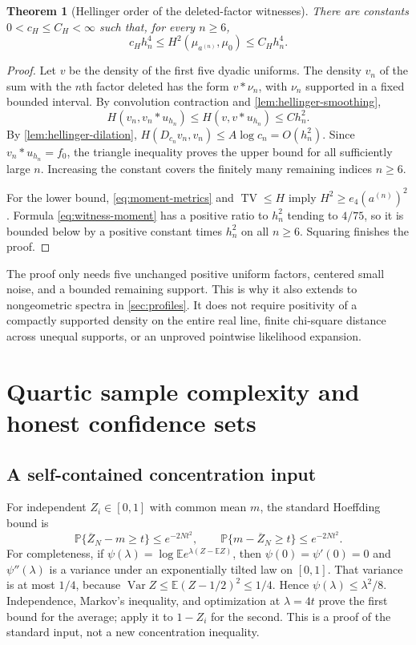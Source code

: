 \documentclass[11pt,a4paper]{article}
\numberwithin{equation}{section}
\newtheorem{theorem}{Theorem}[section]
\theoremstyle{definition}
\theoremstyle{remark}
\DeclareMathOperator{\TV}{TV}
\DeclareMathOperator{\Var}{Var}
\newcommand{\E}{\mathbb E}
\newcommand{\PP}{\mathbb P}
\begin{document}
\begin{theorem}[Hellinger order of the deleted-factor witnesses]
\label{thm:witness-hellinger}
There are constants $0<c_H\le C_H<\infty$ such that, for every $n\ge6$,
\begin{equation}
 c_Hh_n^4\le H^2(\mu_{a^{(n)}},\mu_0)\le C_Hh_n^4.
 \label{eq:witness-hellinger}
\end{equation}
\end{theorem}
\begin{proof}
Let $v$ be the density of the first five dyadic uniforms. The density $v_n$
of the sum with the $n$th factor deleted has the form $v*\nu_n$, with
$\nu_n$ supported in a fixed bounded interval. By convolution contraction
and \cref{lem:hellinger-smoothing},
\[
 H(v_n,v_n*u_{h_n})\le H(v,v*u_{h_n})\le C h_n^2.
\]
By \cref{lem:hellinger-dilation},
$H(D_{c_n}v_n,v_n)\le A\log c_n=O(h_n^2)$.
Since $v_n*u_{h_n}=f_0$, the triangle inequality proves the upper bound
for all sufficiently large $n$. Increasing the constant covers the finitely
many remaining indices $n\ge6$.

For the lower bound, \eqref{eq:moment-metrics} and $\TV\le H$ imply
$H^2\ge e_4(a^{(n)})^2$. Formula \eqref{eq:witness-moment} has a positive
ratio to $h_n^2$ tending to $4/75$, so it is bounded below by a positive
constant times $h_n^2$ on all $n\ge6$. Squaring finishes the proof.
\end{proof}

The proof only needs five unchanged positive uniform factors, centered small
noise, and a bounded remaining support. This is why it also extends to
nongeometric spectra in \cref{sec:profiles}. It does not require positivity
of a compactly supported density on the entire real line, finite chi-square
distance across unequal supports, or an unproved pointwise likelihood expansion.

\section{Quartic sample complexity and honest confidence sets}
\label{sec:statistics}

\subsection{A self-contained concentration input}

For independent $Z_i\in[0,1]$ with common mean $m$, the standard Hoeffding
bound \cite{hoeffding} is
\begin{equation}
 \PP\{\overline Z_N-m\ge t\}\le e^{-2Nt^2},\qquad
 \PP\{m-\overline Z_N\ge t\}\le e^{-2Nt^2}.
 \label{eq:hoeffding}
\end{equation}
For completeness, if
$\psi(\lambda)=\log\E e^{\lambda(Z-\E Z)}$, then $\psi(0)=\psi'(0)=0$
and $\psi''(\lambda)$ is a variance under an exponentially tilted law on
$[0,1]$. That variance is at most $1/4$, because
$\Var Z\le\E(Z-1/2)^2\le1/4$. Hence
$\psi(\lambda)\le\lambda^2/8$. Independence, Markov's inequality,
and optimization at $\lambda=4t$ prove the first bound for the average;
apply it to $1-Z_i$ for the second. This is a proof of the standard input,
not a new concentration inequality.
\end{document}
